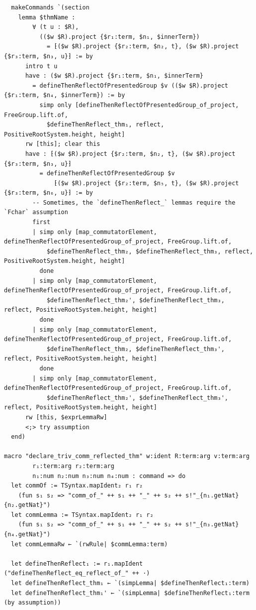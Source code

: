 \documentclass[10pt,a4paper]{article}
\begin{document}
\begin{Verbatim}
  makeCommands `(section
    lemma $thmName :
        ∀ (t u : $R),
          (($w $R).project {$r₁:term, $n₁, $innerTerm})
            = ⁅($w $R).project {$r₂:term, $n₂, t}, ($w $R).project {$r₃:term, $n₃, u}⁆ := by
      intro t u
      have : ($w $R).project {$r₁:term, $n₁, $innerTerm}
        = defineThenReflectOfPresentedGroup $v (($w $R).project {$r₁:term, $n₄, $innerTerm}) := by
          simp only [defineThenReflectOfPresentedGroup_of_project, FreeGroup.lift.of,
            $defineThenReflect_thm₁, reflect, PositiveRootSystem.height, height]
      rw [this]; clear this
      have : ⁅($w $R).project {$r₂:term, $n₂, t}, ($w $R).project {$r₃:term, $n₃, u}⁆
          = defineThenReflectOfPresentedGroup $v
              ⁅($w $R).project {$r₂:term, $n₅, t}, ($w $R).project {$r₃:term, $n₆, u}⁆ := by
        -- Sometimes, the `defineThenReflect_` lemmas require the `Fchar` assumption
        first
        | simp only [map_commutatorElement, defineThenReflectOfPresentedGroup_of_project, FreeGroup.lift.of,
            $defineThenReflect_thm₂, $defineThenReflect_thm₃, reflect, PositiveRootSystem.height, height]
          done
        | simp only [map_commutatorElement, defineThenReflectOfPresentedGroup_of_project, FreeGroup.lift.of,
            $defineThenReflect_thm₂', $defineThenReflect_thm₃, reflect, PositiveRootSystem.height, height]
          done
        | simp only [map_commutatorElement, defineThenReflectOfPresentedGroup_of_project, FreeGroup.lift.of,
            $defineThenReflect_thm₂, $defineThenReflect_thm₃', reflect, PositiveRootSystem.height, height]
          done
        | simp only [map_commutatorElement, defineThenReflectOfPresentedGroup_of_project, FreeGroup.lift.of,
            $defineThenReflect_thm₂', $defineThenReflect_thm₃', reflect, PositiveRootSystem.height, height]
      rw [this, $exprLemmaRw]
      <;> try assumption
  end)

macro "declare_triv_comm_reflected_thm" w:ident R:term:arg v:term:arg
        r₁:term:arg r₂:term:arg
        n₁:num n₂:num n₃:num n₄:num : command => do
  let commOf := TSyntax.mapIdent₂ r₁ r₂
    (fun s₁ s₂ => "comm_of_" ++ s₁ ++ "_" ++ s₂ ++ s!"_{n₁.getNat}{n₂.getNat}")
  let commLemma := TSyntax.mapIdent₂ r₁ r₂
    (fun s₁ s₂ => "comm_of_" ++ s₁ ++ "_" ++ s₂ ++ s!"_{n₃.getNat}{n₄.getNat}")
  let commLemmaRw ← `(rwRule| $commLemma:term)

  let defineThenReflect₁ := r₁.mapIdent ("defineThenReflect_eq_reflect_of_" ++ ·)
  let defineThenReflect_thm₁ ← `(simpLemma| $defineThenReflect₁:term)
  let defineThenReflect_thm₁' ← `(simpLemma| $defineThenReflect₁:term (by assumption))


\end{Verbatim}
\end{document}
